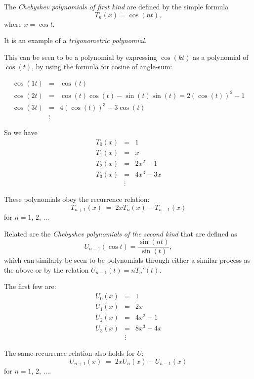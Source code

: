 \documentclass[12pt]{article}
\begin{document}
The \emph{Chebyshev polynomials of first kind} are defined by the simple 
formula $$T_n(x)=\cos(nt),$$ where $x=\cos t$.

It is an example of a \emph{trigonometric polynomial}.

This can be seen to be a polynomial by expressing $\cos(kt)$ as a polynomial of $\cos(t)$, by using the formula for cosine of angle-sum:

\begin{eqnarray*}
\cos(1t)&=&\cos(t)\\
\cos(2t)&=&\cos(t)\cos(t) - \sin(t)\sin(t) = 2(\cos(t))^2-1\\
\cos(3t)&=&4(\cos(t))^3-3\cos(t)\\
&\vdots&
\end{eqnarray*}

So we have
\begin{eqnarray*}
T_0(x)&=&1\\
T_1(x)&=&x\\
T_2(x)&=&2x^2-1\\
T_3(x)&=&4x^3-3x\\
&\vdots&
\end{eqnarray*}

These polynomials obey the recurrence relation:
$$T_{n+1}(x) \;=\; 2xT_n(x)-T_{n-1}(x)$$
for $n = 1,\,2,\,\ldots$

Related are the \emph{Chebyshev polynomials of the second kind} that are
defined as $$U_{n-1}(\cos t) = \frac{\sin(n t)}{\sin (t)},$$ which
can similarly be seen to be polynomials through either a similar process as the
above or by the relation $U_{n-1}(t) = n T_n'(t)$.

The first few are:
\begin{eqnarray*}
U_0(x)&=&1\\
U_1(x)&=&2x\\
U_2(x)&=&4x^2-1\\
U_3(x)&=&8x^3-4x\\
&\vdots&
\end{eqnarray*}

The same recurrence relation also holds for $U$:
$$U_{n+1}(x) \;=\; 2xU_n(x)-U_{n-1}(x)$$
for $n = 1,\,2,\,\ldots$.
\end{document}
